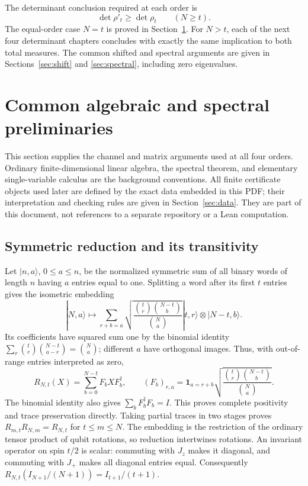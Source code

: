 \documentclass[11pt,a4paper]{article}
\begin{document}
The determinant conclusion required at each order is
\begin{equation}\label{eq:det}
 \det\rho'_t\ge\det\rho_t\qquad(N\ge t).
\end{equation}
The equal-order case $N=t$ is proved in Section~\ref{sec:prelim}.
For $N>t$, each of the next four determinant chapters concludes with
exactly the same implication to both total measures. The common shifted
and spectral arguments are given in Sections~\ref{sec:shift} and
\ref{sec:spectral}, including zero eigenvalues.

\section{Common algebraic and spectral preliminaries}\label{sec:prelim}
This section supplies the channel and matrix arguments used at all four
orders. Ordinary finite-dimensional linear algebra, the spectral theorem,
and elementary single-variable calculus are the background conventions.
All finite certificate objects used later are defined by the exact data
embedded in this PDF; their interpretation and checking rules are given
in Section~\ref{sec:data}. They are part of this document, not references
to a separate repository or a Lean computation.

\subsection{Symmetric reduction and its transitivity}
Let $|n,a\rangle$, $0\le a\le n$, be the normalized symmetric sum of all
binary words of length $n$ having $a$ entries equal to one. Splitting a
word after its first $t$ entries gives the isometric embedding
\[
 |N,a\rangle\longmapsto
 \sum_{r+b=a}\sqrt{\frac{\binom tr\binom{N-t}b}{\binom Na}}
 |t,r\rangle\otimes|N-t,b\rangle.
\]
Its coefficients have squared sum one by the binomial identity
$\sum_r\binom tr\binom{N-t}{a-r}=\binom Na$; different $a$ have
orthogonal images. Thus, with out-of-range entries interpreted as zero,
\begin{equation}\label{eq:reduction-kraus}
 R_{N,t}(X)=\sum_{b=0}^{N-t}F_bXF_b^\dagger,
 \qquad (F_b)_{r,a}=\mathbf1_{a=r+b}
 \sqrt{\frac{\binom tr\binom{N-t}b}{\binom Na}}.
\end{equation}
The binomial identity also gives $\sum_bF_b^\dagger F_b=I$.
This proves complete positivity and trace preservation directly.
Taking partial traces in two stages proves
$R_{m,t}R_{N,m}=R_{N,t}$ for $t\le m\le N$.
The embedding is the restriction of the ordinary tensor product of
qubit rotations, so reduction intertwines rotations. An invariant
operator on spin $t/2$ is scalar: commuting with $J_z$ makes it diagonal,
and commuting with $J_+$ makes all diagonal entries equal.
Consequently $R_{N,t}(I_{N+1}/(N+1))=I_{t+1}/(t+1)$.
\end{document}
